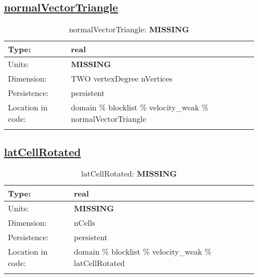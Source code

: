 \subsection[normalVectorTriangle]{\hyperref[sec:var_tab_velocity_weak]{normalVectorTriangle}}
\label{subsec:var_sec_velocity_weak_normalVectorTriangle}
\begin{center}
\begin{longtable}{| p{2.0in} | p{4.0in} |}
        \hline 
        Type: & real \\
        \hline 
        Units: & {\bf \color{red} MISSING} \\
        \hline 
        Dimension: & TWO vertexDegree nVertices \\
        \hline 
        Persistence: & persistent \\
        \hline 
         Location in code: & domain \% blocklist \% velocity\_weak \% normalVectorTriangle \\
         \hline 
    \caption{normalVectorTriangle: {\bf \color{red} MISSING}}
\end{longtable}
\end{center}
\subsection[latCellRotated]{\hyperref[sec:var_tab_velocity_weak]{latCellRotated}}
\label{subsec:var_sec_velocity_weak_latCellRotated}
\begin{center}
\begin{longtable}{| p{2.0in} | p{4.0in} |}
        \hline 
        Type: & real \\
        \hline 
        Units: & {\bf \color{red} MISSING} \\
        \hline 
        Dimension: & nCells \\
        \hline 
        Persistence: & persistent \\
        \hline 
         Location in code: & domain \% blocklist \% velocity\_weak \% latCellRotated \\
         \hline 
    \caption{latCellRotated: {\bf \color{red} MISSING}}
\end{longtable}
\end{center}
